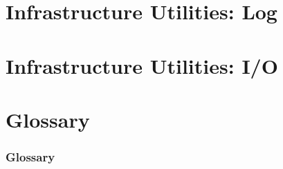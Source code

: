 \documentclass[english]{article}
\newcommand{\shortname}{GR}
\begin{document}


\newpage
\begin{htmlonly}
\end{htmlonly}
\part{Infrastructure Utilities: Log}
\label{part:Infrastructure_Utilities:_Log}

\setcounter{section}{0}
\renewcommand{\thesection}{\shortname\arabic{section}}
\renewcommand{\thesubsection}{\shortname\arabic{section}.\arabic{subsection}}
\renewcommand{\thesubsubsection}{\shortname\arabic{section}.\arabic{subsection}.\arabic{subsubsection}}



\newpage
\begin{htmlonly}
\end{htmlonly}
\part{Infrastructure Utilities: I/O}
\label{part:Infrastructure Utilities:_I/O}

\setcounter{section}{0}
\renewcommand{\thesection}{\shortname\arabic{section}}
\renewcommand{\thesubsection}{\shortname\arabic{section}.\arabic{subsection}}
\renewcommand{\thesubsubsection}{\shortname\arabic{section}.\arabic{subsection}.\arabic{subsubsection}}



\newpage
\begin{htmlonly}
\end{htmlonly}
\part{Glossary}
\label{part:Glossary}

\setcounter{section}{0}
\renewcommand{\thesection}{\shortname\arabic{section}}
\renewcommand{\thesubsection}{\shortname\arabic{section}.\arabic{subsection}}
\renewcommand{\thesubsubsection}{\shortname\arabic{section}.\arabic{subsection}.\arabic{subsubsection}}

\section{Glossary}

\end{document}
